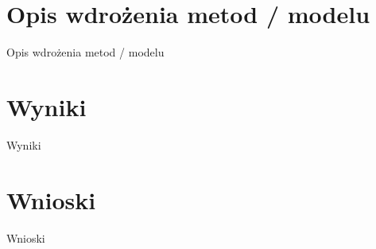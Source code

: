 \documentclass{beamer}
\begin{document}




\section{Opis wdrożenia metod / modelu}




\begin{frame}{Opis wdrożenia metod / modelu}


\end{frame}











\section{Wyniki}


\begin{frame}{Wyniki}

    
\end{frame}




\section{Wnioski}


\begin{frame}{Wnioski}

    
\end{frame}
\end{document}
